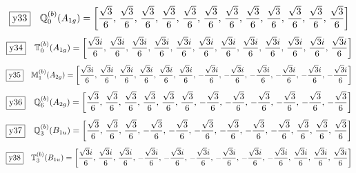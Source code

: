 \documentclass[fleqn,10pt,landscape]{jsarticle}
\begin{document}
\begin{dmath*}
\fbox{y33}\quad \mathbb{Q}_{0}^{(b)}(A_{1g})=\left[ \frac{\sqrt{3}}{6},\, \frac{\sqrt{3}}{6},\, \frac{\sqrt{3}}{6},\, \frac{\sqrt{3}}{6},\, \frac{\sqrt{3}}{6},\, \frac{\sqrt{3}}{6},\, \frac{\sqrt{3}}{6},\, \frac{\sqrt{3}}{6},\, \frac{\sqrt{3}}{6},\, \frac{\sqrt{3}}{6},\, \frac{\sqrt{3}}{6},\, \frac{\sqrt{3}}{6} \right]
\end{dmath*}
\begin{dmath*}
\fbox{y34}\quad \mathbb{T}_{0}^{(b)}(A_{1g})=\left[ \frac{\sqrt{3} i}{6},\, \frac{\sqrt{3} i}{6},\, \frac{\sqrt{3} i}{6},\, \frac{\sqrt{3} i}{6},\, \frac{\sqrt{3} i}{6},\, \frac{\sqrt{3} i}{6},\, \frac{\sqrt{3} i}{6},\, \frac{\sqrt{3} i}{6},\, \frac{\sqrt{3} i}{6},\, \frac{\sqrt{3} i}{6},\, \frac{\sqrt{3} i}{6},\, \frac{\sqrt{3} i}{6} \right]
\end{dmath*}
\begin{dmath*}
\fbox{y35}\quad \mathbb{M}_{1}^{(b)}(A_{2g})=\left[ \frac{\sqrt{3} i}{6},\, \frac{\sqrt{3} i}{6},\, \frac{\sqrt{3} i}{6},\, \frac{\sqrt{3} i}{6},\, \frac{\sqrt{3} i}{6},\, \frac{\sqrt{3} i}{6},\, - \frac{\sqrt{3} i}{6},\, - \frac{\sqrt{3} i}{6},\, - \frac{\sqrt{3} i}{6},\, - \frac{\sqrt{3} i}{6},\, - \frac{\sqrt{3} i}{6},\, - \frac{\sqrt{3} i}{6} \right]
\end{dmath*}
\begin{dmath*}
\fbox{y36}\quad \mathbb{Q}_{6}^{(b)}(A_{2g})=\left[ \frac{\sqrt{3}}{6},\, \frac{\sqrt{3}}{6},\, \frac{\sqrt{3}}{6},\, \frac{\sqrt{3}}{6},\, \frac{\sqrt{3}}{6},\, \frac{\sqrt{3}}{6},\, - \frac{\sqrt{3}}{6},\, - \frac{\sqrt{3}}{6},\, - \frac{\sqrt{3}}{6},\, - \frac{\sqrt{3}}{6},\, - \frac{\sqrt{3}}{6},\, - \frac{\sqrt{3}}{6} \right]
\end{dmath*}
\begin{dmath*}
\fbox{y37}\quad \mathbb{Q}_{3}^{(b)}(B_{1u})=\left[ \frac{\sqrt{3}}{6},\, \frac{\sqrt{3}}{6},\, \frac{\sqrt{3}}{6},\, - \frac{\sqrt{3}}{6},\, - \frac{\sqrt{3}}{6},\, - \frac{\sqrt{3}}{6},\, - \frac{\sqrt{3}}{6},\, - \frac{\sqrt{3}}{6},\, - \frac{\sqrt{3}}{6},\, \frac{\sqrt{3}}{6},\, \frac{\sqrt{3}}{6},\, \frac{\sqrt{3}}{6} \right]
\end{dmath*}
\begin{dmath*}
\fbox{y38}\quad \mathbb{T}_{3}^{(b)}(B_{1u})=\left[ \frac{\sqrt{3} i}{6},\, \frac{\sqrt{3} i}{6},\, \frac{\sqrt{3} i}{6},\, - \frac{\sqrt{3} i}{6},\, - \frac{\sqrt{3} i}{6},\, - \frac{\sqrt{3} i}{6},\, - \frac{\sqrt{3} i}{6},\, - \frac{\sqrt{3} i}{6},\, - \frac{\sqrt{3} i}{6},\, \frac{\sqrt{3} i}{6},\, \frac{\sqrt{3} i}{6},\, \frac{\sqrt{3} i}{6} \right]
\end{dmath*}
\end{document}
